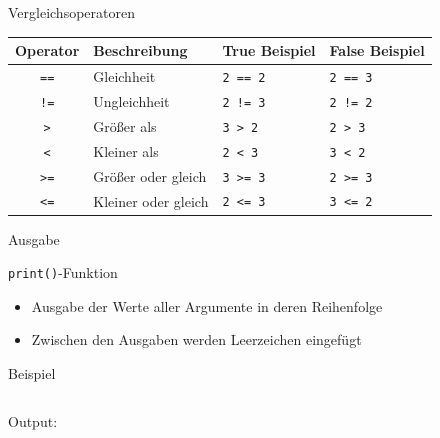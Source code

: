 \documentclass[xelatex,aspectratio=169]{beamer}
\begin{document}
\begin{frame}{Vergleichsoperatoren}
  \vspace{-12pt}
  \begin{table}[]
    \small
    \begin{tabular}{clll}
      \toprule
      \textbf{Operator} & \textbf{Beschreibung} & \textbf{True Beispiel} & \textbf{False Beispiel} \\
      \midrule
      \texttt{==}       & Gleichheit            & \texttt{2 == 2}        & \texttt{2 == 3}         \\
      \texttt{!=}       & Ungleichheit          & \texttt{2 != 3}        & \texttt{2 != 2}         \\
      \texttt{>}        & Größer als            & \texttt{3 > 2}         & \texttt{2 > 3}          \\
      \texttt{<}        & Kleiner als           & \texttt{2 < 3}         & \texttt{3 < 2}          \\
      \texttt{>=}       & Größer oder gleich    & \texttt{3 >= 3}        & \texttt{2 >= 3}         \\
      \texttt{<=}       & Kleiner oder gleich   & \texttt{2 <= 3}        & \texttt{3 <= 2}         \\
      \bottomrule
    \end{tabular}
  \end{table}
\end{frame}

\begin{frame}{Ausgabe}
  \begin{block}{\texttt{print()}-Funktion}
    \begin{itemize}
      \item Ausgabe der Werte aller Argumente in deren Reihenfolge
      \item Zwischen den Ausgaben werden Leerzeichen eingefügt
    \end{itemize}
  \end{block}
  \begin{exampleblock}{Beispiel}
    \inputminted{python}{src/print_komma_example.py}
    Output:
    \inputminted{console}{src/print_komma_example_output}
  \end{exampleblock}
\end{frame}
\end{document}
